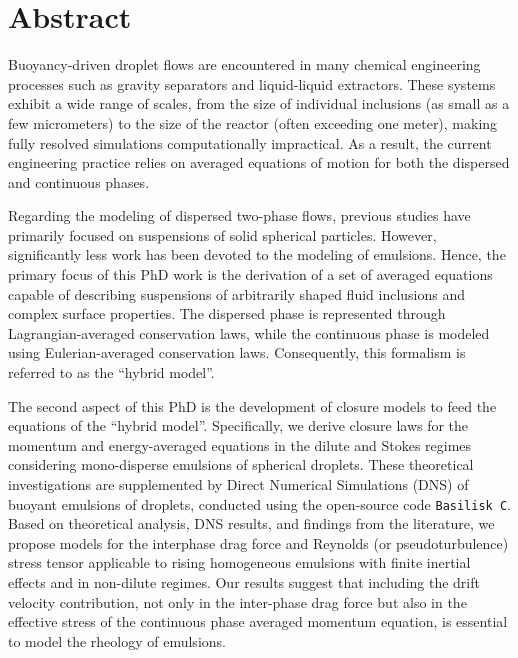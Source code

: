 \chapter*{\centering Abstract}

Buoyancy-driven droplet flows are encountered in many chemical engineering processes such as gravity separators and liquid-liquid extractors. 
These systems exhibit a wide range of scales, from the size of individual inclusions (as small as a few micrometers) to the size of the reactor (often exceeding one meter), making fully resolved simulations computationally impractical.
As a result, the current engineering practice relies on averaged equations of motion for both the dispersed and continuous phases.

Regarding the modeling of dispersed two-phase flows, previous studies have primarily focused on suspensions of solid spherical particles. 
However, significantly less work has been devoted to the modeling of emulsions. 
Hence, the primary focus of this PhD work is the derivation of a set of averaged equations capable of describing suspensions of arbitrarily shaped fluid inclusions and complex surface properties. 
The dispersed phase is represented through Lagrangian-averaged conservation laws, while the continuous phase is modeled using Eulerian-averaged conservation laws. 
Consequently, this formalism is referred to as the ``hybrid model''. 

The second aspect of this PhD is the development of closure models to feed the equations of the ``hybrid model''. 
Specifically, we derive closure laws for the momentum and energy-averaged equations in the dilute and Stokes regimes considering mono-disperse emulsions of spherical droplets. 
These theoretical investigations are supplemented by Direct Numerical Simulations (DNS) of buoyant emulsions of droplets, conducted using the open-source code \texttt{Basilisk C}. 
Based on theoretical analysis, DNS results, and findings from the literature, we propose models for the interphase drag force and Reynolds (or pseudoturbulence) stress tensor applicable to rising homogeneous emulsions with finite inertial effects and in non-dilute regimes. 
Our results suggest that including the drift velocity contribution, not only in the inter-phase drag force but also in the effective stress of the continuous phase averaged momentum equation, is essential to model the rheology of emulsions. 

